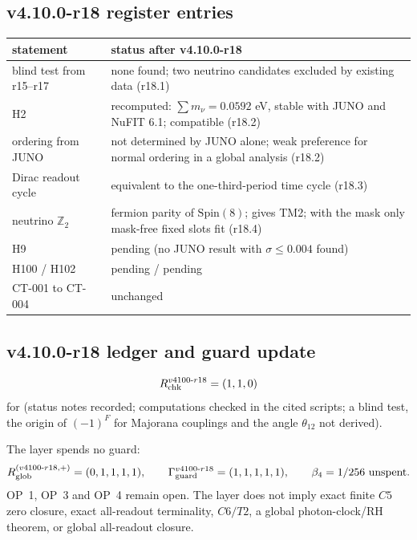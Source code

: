 \subsection*{v4.10.0-r18 register entries}
\label{subsec:v4100-r18-register}

\begin{center}
\small
\begin{tabular}{@{}>{\raggedright\arraybackslash}p{}>{\raggedright\arraybackslash}p{}@{}}
\toprule
statement & status after v4.10.0-r18\\
\midrule
blind test from r15--r17 & none found; two neutrino candidates excluded by existing data (r18.1)\\
H2 & recomputed: \(\sum m_\nu=0.0592\) eV, stable with JUNO and NuFIT 6.1; compatible (r18.2)\\
ordering from JUNO & not determined by JUNO alone; weak preference for normal ordering in a global analysis (r18.2)\\
Dirac readout cycle & equivalent to the one-third-period time cycle (r18.3)\\
neutrino \(\mathbb Z_2\) & fermion parity of \(\mathrm{Spin}(8)\); gives TM2; with the mask only mask-free fixed slots fit (r18.4)\\
H9 & pending (no JUNO result with \(\sigma\le0.004\) found)\\
H100 / H102 & pending / pending\\
CT-001 to CT-004 & unchanged\\
\bottomrule
\end{tabular}
\end{center}

\subsection*{v4.10.0-r18 ledger and guard update}
\label{subsec:v4100-r18-ledger-guard}

\[
R_{\rm chk}^{v4100\text{-}r18}=(1,1,0)
\]
for (status notes recorded; computations checked in the cited scripts; a blind test, the origin of \((-1)^F\) for Majorana couplings and
the angle \(\theta_{12}\) not derived).

The layer spends no guard:
\[
R_{\rm glob}^{(v4100\text{-}r18,+)}=(0,1,1,1,1),
\qquad
\Gamma_{\rm guard}^{v4100\text{-}r18}=(1,1,1,1,1),
\qquad
\beta_4=1/256\ \text{unspent}.
\]
OP~1, OP~3 and OP~4 remain open.  The layer does not imply exact finite \(C5\) zero closure, exact all-readout terminality,
\(C6/T2\), a global photon-clock/RH theorem, or global all-readout closure.

